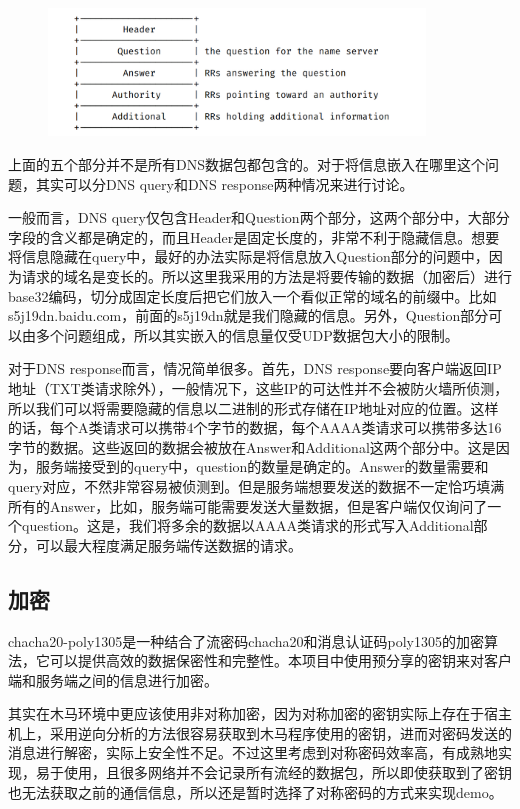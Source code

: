 \documentclass[UTF8]{ctexart}
\begin{document}
\begin{figure}[h]
	\centering
	\includegraphics[width=10cm]{images/dns.png}
\end{figure}

	上面的五个部分并不是所有DNS数据包都包含的。对于将信息嵌入在哪里这个问题，其实可以分DNS query和DNS response两种情况来进行讨论。
	
	一般而言，DNS query仅包含Header和Question两个部分，这两个部分中，大部分字段的含义都是确定的，而且Header是固定长度的，非常不利于隐藏信息。想要将信息隐藏在query中，最好的办法实际是将信息放入Question部分的问题中，因为请求的域名是变长的。所以这里我采用的方法是将要传输的数据（加密后）进行base32编码，切分成固定长度后把它们放入一个看似正常的域名的前缀中。比如 s5j19dn.baidu.com，前面的s5j19dn就是我们隐藏的信息。另外，Question部分可以由多个问题组成，所以其实嵌入的信息量仅受UDP数据包大小的限制。

	对于DNS response而言，情况简单很多。首先，DNS response要向客户端返回IP地址（TXT类请求除外），一般情况下，这些IP的可达性并不会被防火墙所侦测，所以我们可以将需要隐藏的信息以二进制的形式存储在IP地址对应的位置。这样的话，每个A类请求可以携带4个字节的数据，每个AAAA类请求可以携带多达16字节的数据。这些返回的数据会被放在Answer和Additional这两个部分中。这是因为，服务端接受到的query中，question的数量是确定的。Answer的数量需要和query对应，不然非常容易被侦测到。但是服务端想要发送的数据不一定恰巧填满所有的Answer，比如，服务端可能需要发送大量数据，但是客户端仅仅询问了一个question。这是，我们将多余的数据以AAAA类请求的形式写入Additional部分，可以最大程度满足服务端传送数据的请求。

	\subsection{加密}

	chacha20-poly1305是一种结合了流密码chacha20和消息认证码poly1305的加密算法，它可以提供高效的数据保密性和完整性。本项目中使用预分享的密钥来对客户端和服务端之间的信息进行加密。

	其实在木马环境中更应该使用非对称加密，因为对称加密的密钥实际上存在于宿主机上，采用逆向分析的方法很容易获取到木马程序使用的密钥，进而对密码发送的消息进行解密，实际上安全性不足。不过这里考虑到对称密码效率高，有成熟地实现，易于使用，且很多网络并不会记录所有流经的数据包，所以即使获取到了密钥也无法获取之前的通信信息，所以还是暂时选择了对称密码的方式来实现demo。
\end{document}
